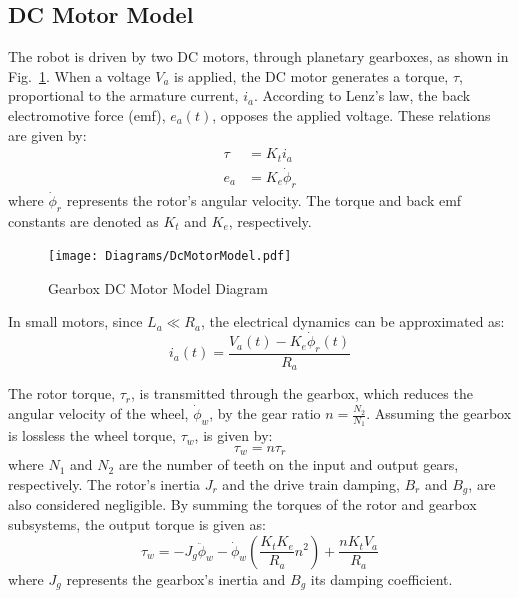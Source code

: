     
    \subsection{DC Motor Model}    
    The robot is driven by two DC motors, through planetary gearboxes, as shown in Fig.~\ref{fig:DCMotor}.
    When a voltage $V_a$ is applied, the DC motor generates a torque, $\tau$, 
    proportional to the armature current, $i_a$.
    According to Lenz's law, the back electromotive force (emf), $e_a(t)$, 
    opposes the applied voltage. These relations are given by:
    \begin{subequations}
        \begin{align}
            \tau &= K_t i_a \\
            e_a &= K_e \dot{\phi}_r
        \end{align}
    \end{subequations}
    where $\dot{\phi}_r$ represents the rotor's angular velocity. The torque 
    and back emf constants are denoted as $K_t$ and $K_e$, respectively.
    \begin{figure}[H]
        \centering
            \texttt{[image: Diagrams/DcMotorModel.pdf]}
        \caption{Gearbox DC Motor Model Diagram}
        \label{fig:DCMotor}
    \end{figure}
    In small motors, since $L_a \ll R_a$, the electrical dynamics can be approximated as:
    \begin{equation}
        i_a (t) = \frac{V_a (t) - K_e \dot{\phi}_r (t)}{R_a}
    \end{equation}

    The rotor torque, $\tau_r$, is transmitted through the gearbox, which 
    reduces the angular velocity of the wheel, $\dot{\phi}_w$, by the gear ratio $n = \frac{N_2}{N_1}$. 
    Assuming the gearbox is lossless the wheel torque, $\tau_w$, is given by:
    \begin{equation}
            \tau_w = n\tau_r
    \end{equation}
    where $N_1$ and $N_2$ are the number of teeth on the input and output gears, respectively.
    The rotor's inertia $J_r$ and the drive train damping, $B_r$ and $B_g$, are also considered negligible.
    By summing the torques of the rotor and gearbox subsystems, the output torque is given as:
    \begin{equation}
        \tau_w = - J_g \ddot{\phi}_w - \dot{\phi}_w \left( \frac{K_t K_e}{R_a} n^2 \right) + \frac{n K_t V_a}{R_a}
        \label{eq:DCMotorTorque}
    \end{equation}
    where $J_g$ represents the gearbox's inertia and $B_g$ its damping coefficient.

